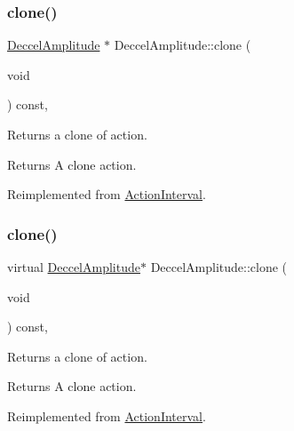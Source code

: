 \subsubsection{\texorpdfstring{clone()}{clone()}\hspace{0.1cm}{\footnotesize\ttfamily [1/2]}}
{\footnotesize\ttfamily \hyperlink{classDeccelAmplitude}{Deccel\+Amplitude} $\ast$ Deccel\+Amplitude\+::clone (\begin{DoxyParamCaption}\item[{void}]{ }\end{DoxyParamCaption}) const\hspace{0.3cm}{\ttfamily [override]}, {\ttfamily [virtual]}}

Returns a clone of action.

\begin{DoxyReturn}{Returns}
A clone action. 
\end{DoxyReturn}


Reimplemented from \hyperlink{classActionInterval_abc93ce0c2f54a90eb216a7803f25f44a}{Action\+Interval}.

\mbox{\label{classDeccelAmplitude_a769fbde5c93a7b4a660cbeca9332dce9}} 
\subsubsection{\texorpdfstring{clone()}{clone()}\hspace{0.1cm}{\footnotesize\ttfamily [2/2]}}
{\footnotesize\ttfamily virtual \hyperlink{classDeccelAmplitude}{Deccel\+Amplitude}$\ast$ Deccel\+Amplitude\+::clone (\begin{DoxyParamCaption}\item[{void}]{ }\end{DoxyParamCaption}) const\hspace{0.3cm}{\ttfamily [override]}, {\ttfamily [virtual]}}

Returns a clone of action.

\begin{DoxyReturn}{Returns}
A clone action. 
\end{DoxyReturn}


Reimplemented from \hyperlink{classActionInterval_abc93ce0c2f54a90eb216a7803f25f44a}{Action\+Interval}.

\mbox{\label{classDeccelAmplitude_a9316a87a85acf7b557ca1a2866f3710a}} 
